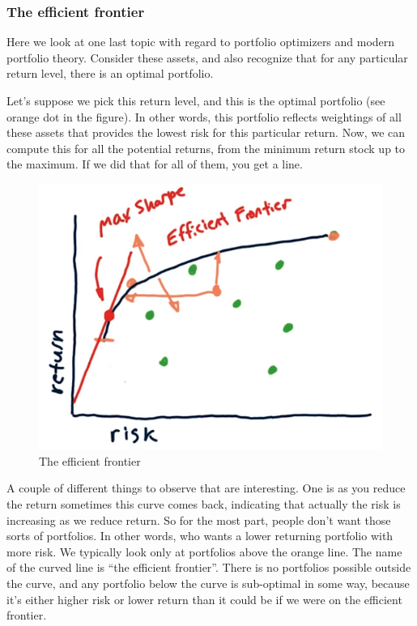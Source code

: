 \documentclass[12pt]{article}
\newcommand{\q}[1]{``#1''}
\begin{document}
\subsubsection{The efficient frontier}

Here we look at one last topic with regard to portfolio optimizers and modern portfolio theory. Consider these assets, and also recognize that for any particular return level, there is an optimal portfolio. 

Let's suppose we pick this return level, and this is the optimal portfolio (see orange dot in the figure). In other words, this portfolio reflects weightings of all these assets that provides the lowest risk for this particular return. Now, we can compute this for all the potential returns, from the minimum return stock up to the maximum. If we did that for all of them, you get a line. 

\begin{figure}[!ht]
\centering
\includegraphics[scale=0.45]{fig/fig70}
\caption{The efficient frontier}
\end{figure}

A couple of different things to observe that are interesting. One is as you reduce the return sometimes this curve comes back, indicating that actually the risk is increasing as we reduce return. So for the most part, people don't want those sorts of portfolios. In other words, who wants a lower returning portfolio with more risk. We typically look only at portfolios above the orange line. The name of the curved line is \q{the efficient frontier}. There is no portfolios possible outside the curve, and any portfolio below the curve is sub-optimal in some way, because it's either higher risk or lower return than it could be if we were on the efficient frontier. 
\end{document}
